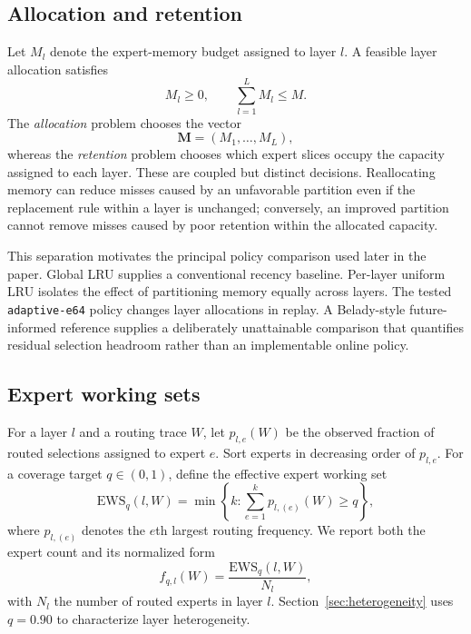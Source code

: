 \subsection{Allocation and retention}

Let $M_l$ denote the expert-memory budget assigned to layer $l$. A feasible layer allocation satisfies
\begin{equation}
    M_l \geq 0,
    \qquad
    \sum_{l=1}^{L} M_l \leq M .
    \label{eq:allocation-budget}
\end{equation}
The \emph{allocation} problem chooses the vector
\begin{equation}
    \mathbf{M}=(M_1,\ldots,M_L),
    \label{eq:allocation-vector}
\end{equation}
whereas the \emph{retention} problem chooses which expert slices occupy the capacity assigned to each layer. These are coupled but distinct decisions. Reallocating memory can reduce misses caused by an unfavorable partition even if the replacement rule within a layer is unchanged; conversely, an improved partition cannot remove misses caused by poor retention within the allocated capacity.

This separation motivates the principal policy comparison used later in the paper. Global LRU supplies a conventional recency baseline. Per-layer uniform LRU isolates the effect of partitioning memory equally across layers. The tested \texttt{adaptive-e64} policy changes layer allocations in replay. A Belady-style future-informed reference supplies a deliberately unattainable comparison that quantifies residual selection headroom rather than an implementable online policy.

\subsection{Expert working sets}

For a layer $l$ and a routing trace $W$, let $p_{l,e}(W)$ be the observed fraction of routed selections assigned to expert $e$. Sort experts in decreasing order of $p_{l,e}$. For a coverage target $q\in(0,1)$, define the effective expert working set
\begin{equation}
    \mathrm{EWS}_{q}(l,W)
    =
    \min\left\{
        k:
        \sum_{e=1}^{k} p_{l,(e)}(W) \geq q
    \right\},
    \label{eq:ews}
\end{equation}
where $p_{l,(e)}$ denotes the $e$th largest routing frequency. We report both the expert count and its normalized form
\begin{equation}
    f_{q,l}(W)
    =
    \frac{\mathrm{EWS}_{q}(l,W)}{N_l},
    \label{eq:ews-fraction}
\end{equation}
with $N_l$ the number of routed experts in layer $l$. Section~\ref{sec:heterogeneity} uses $q=0.90$ to characterize layer heterogeneity.

